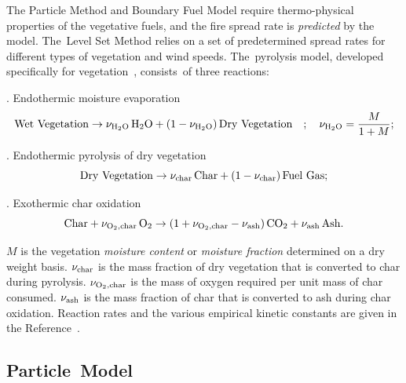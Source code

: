 \documentclass[atmosphere,article,accept,moreauthors,pdftex]{Definitions/mdpi}
\begin{document}
\begin{paracol}{2}
The Particle Method and Boundary Fuel Model require thermo-physical properties of the vegetative fuels, and the fire spread rate is {\em predicted} by the model. The~Level Set Method relies on a set of predetermined spread rates for different types of vegetation and wind speeds. The~pyrolysis model, developed specifically for vegetation~\cite{Porterie:2006,Morvan:CF2004,Houssami:2016}, \mbox{consists of} three reactions:

\vspace{\baselineskip}

. Endothermic moisture evaporation
\begin{equation}
 {\rm Wet\ Vegetation} \rightarrow \nu_{\rm H_2O} \, {\rm H_2O} + (1-\nu_{\rm H_2O}) \, {\rm Dry\ Vegetation} \quad ; \quad \nu_{\rm H_2O} = \frac{M}{1+M};
\end{equation}

. Endothermic pyrolysis of dry vegetation
\begin{equation}
 {\rm Dry\ Vegetation} \rightarrow \nu_{\rm char} \, {\rm Char} + (1-\nu_{\rm char}) \, {\rm Fuel\ Gas};
\end{equation}

. Exothermic char oxidation
\begin{equation}
 \label{char_reaction}
 {\rm Char} + \nu_{\rm O_2, char} \, {\rm O_2} \rightarrow (1+ \nu_{\rm O_2,char} - \nu_{\rm ash}) \, {\rm CO_2} + \nu_{\rm ash} \, {\rm Ash}.
\end{equation}

$M$ is the vegetation {\em moisture content} or {\em moisture fraction} determined on a dry weight basis. $\nu_{\rm char}$ is the mass fraction of dry vegetation that is converted to char during pyrolysis.   $\nu_{\rm O_2,char}$ is the mass of oxygen required per unit mass of char consumed. $\nu_{\rm ash}$  is the mass fraction of char that is converted to ash during char oxidation. Reaction rates and the various empirical kinetic constants are given in the Reference~\cite{Porterie:2006,Morvan:CF2004,Houssami:2016}.

\subsection{Particle~Model}
\label{particle_model}


\end{paracol}
\end{document}
